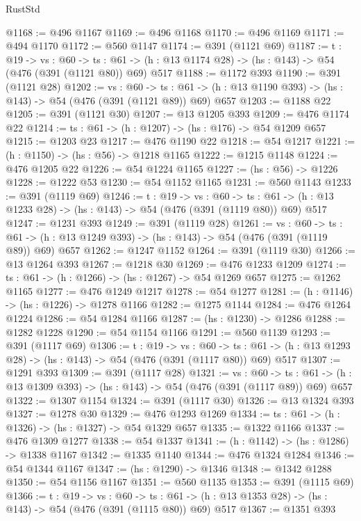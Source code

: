 \begin{lexlean}{RustStd}
\begin{coremodule}
{\begin{coremodule}
{{{{{{{@1168 := @496 @1167
@1169 := @496 @1168
@1170 := @496 @1169
@1171 := @494 @1170
@1172 := @560 @1147
@1174 := @391 (@1121 @69)
@1187 := {t : @19} ->
  {vs : @60} ->
  {ts : @61} -> (h : @13 @1174 @28) -> (hs : @143) -> @54 (@476 (@391 (@1121 @80)) @69) @517
@1188 := @1172 @393
@1190 := @391 (@1121 @28)
@1202 := {vs : @60} ->
  {ts : @61} -> (h : @13 @1190 @393) -> (hs : @143) -> @54 (@476 (@391 (@1121 @89)) @69) @657
@1203 := @1188 @22
@1205 := @391 (@1121 @30)
@1207 := @13 @1205 @393
@1209 := @476 @1174 @22
@1214 := {ts : @61} -> (h : @1207) -> (hs : @176) -> @54 @1209 @657
@1215 := @1203 @23
@1217 := @476 @1190 @22
@1218 := @54 @1217
@1221 := (h : @1150) -> (hs : @56) -> @1218 @1165
@1222 := @1215 @1148
@1224 := @476 @1205 @22
@1226 := @54 @1224 @1165
@1227 := (hs : @56) -> @1226
@1228 := @1222 @53
@1230 := @54 @1152 @1165
@1231 := @560 @1143
@1233 := @391 (@1119 @69)
@1246 := {t : @19} ->
  {vs : @60} ->
  {ts : @61} -> (h : @13 @1233 @28) -> (hs : @143) -> @54 (@476 (@391 (@1119 @80)) @69) @517
@1247 := @1231 @393
@1249 := @391 (@1119 @28)
@1261 := {vs : @60} ->
  {ts : @61} -> (h : @13 @1249 @393) -> (hs : @143) -> @54 (@476 (@391 (@1119 @89)) @69) @657
@1262 := @1247 @1152
@1264 := @391 (@1119 @30)
@1266 := @13 @1264 @393
@1267 := @1218 @30
@1269 := @476 @1233 @1209
@1274 := {ts : @61} -> (h : @1266) -> (hs : @1267) -> @54 @1269 @657
@1275 := @1262 @1165
@1277 := @476 @1249 @1217
@1278 := @54 @1277
@1281 := (h : @1146) -> (hs : @1226) -> @1278 @1166
@1282 := @1275 @1144
@1284 := @476 @1264 @1224
@1286 := @54 @1284 @1166
@1287 := (hs : @1230) -> @1286
@1288 := @1282 @1228
@1290 := @54 @1154 @1166
@1291 := @560 @1139
@1293 := @391 (@1117 @69)
@1306 := {t : @19} ->
  {vs : @60} ->
  {ts : @61} -> (h : @13 @1293 @28) -> (hs : @143) -> @54 (@476 (@391 (@1117 @80)) @69) @517
@1307 := @1291 @393
@1309 := @391 (@1117 @28)
@1321 := {vs : @60} ->
  {ts : @61} -> (h : @13 @1309 @393) -> (hs : @143) -> @54 (@476 (@391 (@1117 @89)) @69) @657
@1322 := @1307 @1154
@1324 := @391 (@1117 @30)
@1326 := @13 @1324 @393
@1327 := @1278 @30
@1329 := @476 @1293 @1269
@1334 := {ts : @61} -> (h : @1326) -> (hs : @1327) -> @54 @1329 @657
@1335 := @1322 @1166
@1337 := @476 @1309 @1277
@1338 := @54 @1337
@1341 := (h : @1142) -> (hs : @1286) -> @1338 @1167
@1342 := @1335 @1140
@1344 := @476 @1324 @1284
@1346 := @54 @1344 @1167
@1347 := (hs : @1290) -> @1346
@1348 := @1342 @1288
@1350 := @54 @1156 @1167
@1351 := @560 @1135
@1353 := @391 (@1115 @69)
@1366 := {t : @19} ->
  {vs : @60} ->
  {ts : @61} -> (h : @13 @1353 @28) -> (hs : @143) -> @54 (@476 (@391 (@1115 @80)) @69) @517
@1367 := @1351 @393
}}}}}}}
\end{coremodule}}
\end{coremodule}
\end{lexlean}
